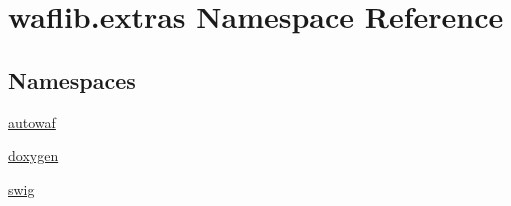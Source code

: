 \hypertarget{namespacewaflib_1_1extras}{}\section{waflib.\+extras Namespace Reference}
\label{namespacewaflib_1_1extras}
\subsection*{Namespaces}
\begin{DoxyCompactItemize}
\item 
 \hyperlink{namespacewaflib_1_1extras_1_1autowaf}{autowaf}
\item 
 \hyperlink{namespacewaflib_1_1extras_1_1doxygen}{doxygen}
\item 
 \hyperlink{namespacewaflib_1_1extras_1_1swig}{swig}
\end{DoxyCompactItemize}
